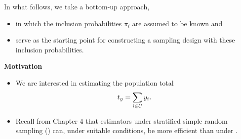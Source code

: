 \documentclass{my_eth_beamer}
\numberwithin{equation}{section}
\begin{document}
\begin{frame}
    In what follows, we take a \alert{bottom-up approach},
    \vspace{0.25em}
    \begin{itemize}
    \setlength{\itemsep}{8pt}
        \item in which the inclusion probabilities $\pi_i$ are assumed to be
            \alert{known} and
        \item serve as the \alert{starting point} for constructing a sampling
            design with these inclusion probabilities.
    \end{itemize}

    \vspace{2em}

    \textbf{\textcolor{fhnwblue}{Motivation}}
    \vspace{0.25em}
    \begin{itemize}
    \setlength{\itemsep}{8pt}
        \item We are interested in estimating the population total
            \begin{equation*}
                t_y = \sum_{i \in U} y_i.
            \end{equation*}
        \item Recall from Chapter 4 that estimators under \alert{stratified}
            simple random sampling (\STSI) can, under suitable conditions, be
            \alert{more efficient} than under \SRS.
    \end{itemize}
\end{frame}
\end{document}
